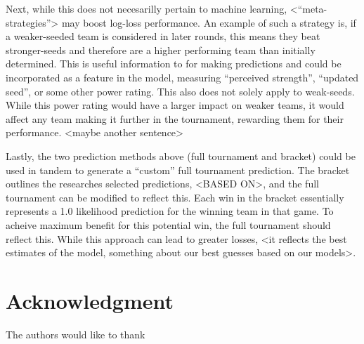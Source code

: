 \documentclass[conference]{IEEEtran}
\begin{document}
Next, while this does not necesarilly pertain to machine learning, <``meta-strategies''> may boost log-loss performance. An example of such a strategy is, if a weaker-seeded team is considered in later rounds, this means they beat stronger-seeds and therefore are a higher performing team than initially determined. This is useful information to for making predictions and could be incorporated as a feature in the model, measuring ``perceived strength'', ``updated seed'', or some other power rating. This also does not solely apply to weak-seeds. While this power rating would have a larger impact on weaker teams, it would affect any team making it further in the tournament, rewarding them for their performance. <maybe another sentence>

Lastly, the two prediction methods above (full tournament and bracket) could be used in tandem to generate a ``custom'' full tournament prediction. The bracket outlines the researches selected predictions, <BASED ON>, and the full tournament can be modified to reflect this. Each win in the bracket essentially represents a 1.0 likelihood prediction for the winning team in that game. To acheive maximum benefit for this potential win, the full tournament should reflect this. While this approach can lead to greater losses, <it reflects the best estimates of the model, something about our best guesses based on our models>.

\section*{Acknowledgment}
The authors would like to thank





%
%


\end{document}
